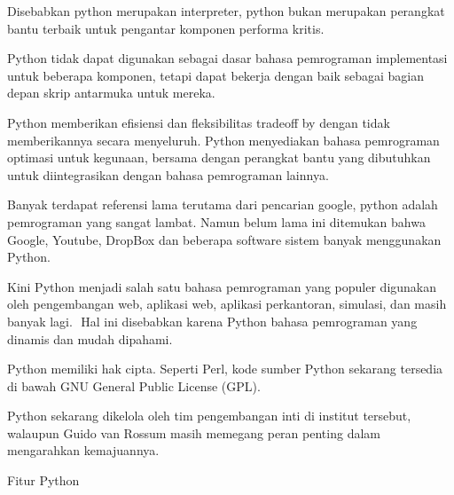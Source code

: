 \noindent 
{\fontsize{14pt}{14pt}\selectfont Disebabkan python merupakan interpreter, python bukan merupakan perangkat bantu terbaik untuk pengantar komponen performa kritis. \\} \par
\noindent 
{\fontsize{14pt}{14pt}\selectfont Python tidak dapat digunakan sebagai dasar bahasa pemrograman implementasi untuk beberapa komponen, tetapi dapat bekerja dengan baik sebagai bagian depan skrip antarmuka untuk mereka. \\} \par
\noindent 
{\fontsize{14pt}{14pt}\selectfont Python memberikan efisiensi dan fleksibilitas tradeoff by dengan tidak memberikannya secara menyeluruh. Python menyediakan bahasa pemrograman optimasi untuk kegunaan, bersama dengan perangkat bantu yang dibutuhkan untuk diintegrasikan dengan bahasa pemrograman lainnya. \\} \par
\noindent 
{\fontsize{14pt}{14pt}\selectfont Banyak terdapat referensi lama terutama dari pencarian google, python adalah pemrograman yang sangat lambat. Namun belum lama ini ditemukan bahwa Google, Youtube, DropBox dan beberapa software sistem banyak menggunakan Python. \\} \par
\noindent 
{\fontsize{14pt}{14pt}\selectfont Kini Python menjadi salah satu bahasa pemrograman yang populer digunakan oleh pengembangan $  $web, aplikasi $  $web, aplikasi perkantoran, simulasi, dan masih banyak lagi. $  $ Hal ini disebabkan karena Python bahasa pemrograman yang dinamis dan mudah dipahami. \\} \par
\vspace{14pt}
\noindent 
{\fontsize{14pt}{14pt}\selectfont Python memiliki hak cipta. Seperti Perl, kode sumber Python sekarang tersedia di bawah GNU General Public License (GPL). \\} \par
\vspace{14pt}
\noindent 
{\fontsize{14pt}{14pt}\selectfont Python sekarang dikelola oleh tim pengembangan inti di institut tersebut, walaupun Guido van Rossum masih memegang peran penting dalam mengarahkan kemajuannya. \\} \par
\vspace{14pt}
\noindent 
{\fontsize{14pt}{14pt}\selectfont Fitur Python \\} \par

